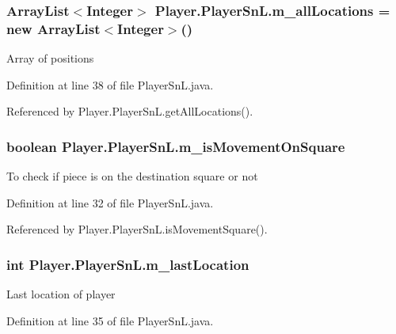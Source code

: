 \subsubsection[{m\+\_\+all\+Locations}]{\setlength{\rightskip}{0pt plus 5cm}Array\+List$<$Integer$>$ Player.\+Player\+Sn\+L.\+m\+\_\+all\+Locations = new Array\+List$<$Integer$>$()}\label{class_player_1_1_player_sn_l_a592990cc22e4082b31cae3e31124fcd6}
Array of positions 

Definition at line 38 of file Player\+Sn\+L.\+java.



Referenced by Player.\+Player\+Sn\+L.\+get\+All\+Locations().

\hypertarget{class_player_1_1_player_sn_l_a41a8f9cd3f8340cccedd9393a8698477}{}
\subsubsection[{m\+\_\+is\+Movement\+On\+Square}]{\setlength{\rightskip}{0pt plus 5cm}boolean Player.\+Player\+Sn\+L.\+m\+\_\+is\+Movement\+On\+Square}\label{class_player_1_1_player_sn_l_a41a8f9cd3f8340cccedd9393a8698477}
To check if piece is on the destination square or not 

Definition at line 32 of file Player\+Sn\+L.\+java.



Referenced by Player.\+Player\+Sn\+L.\+is\+Movement\+Square().

\hypertarget{class_player_1_1_player_sn_l_a67ec420adf012813b5b6bf74237e0180}{}
\subsubsection[{m\+\_\+last\+Location}]{\setlength{\rightskip}{0pt plus 5cm}int Player.\+Player\+Sn\+L.\+m\+\_\+last\+Location}\label{class_player_1_1_player_sn_l_a67ec420adf012813b5b6bf74237e0180}
Last location of player 

Definition at line 35 of file Player\+Sn\+L.\+java.



